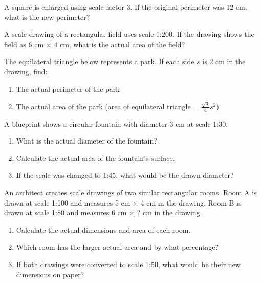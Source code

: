 \documentclass[12pt]{article}
\begin{document}
\begin{enumerate}[left=0pt, start=11]

\item A square is enlarged using scale factor 3. If the original perimeter was 12 cm, what is the new perimeter?

\item A scale drawing of a rectangular field uses scale 1:200. If the drawing shows the field as 6 cm × 4 cm, what is the actual area of the field?


The equilateral triangle below represents a park. If each side $s$ is 2 cm in the drawing, find:
\begin{enumerate}
    \item The actual perimeter of the park
    \item The actual area of the park (area of equilateral triangle = $\frac{\sqrt{3}}{4}s^2$)
\end{enumerate}

\begin{center}
\item {}
\end{center}

\newpage{}

\item A blueprint shows a circular fountain with diameter 3 cm at scale 1:30. 
\begin{enumerate}
    \item What is the actual diameter of the fountain?
    \item Calculate the actual area of the fountain's surface.
    \item If the scale was changed to 1:45, what would be the drawn diameter?
\end{enumerate}

\item An architect creates scale drawings of two similar rectangular rooms. Room A is drawn at scale 1:100 and measures 5 cm × 4 cm in the drawing. Room B is drawn at scale 1:80 and measures 6 cm × ? cm in the drawing.
\begin{enumerate}
    \item Calculate the actual dimensions and area of each room.
    \item Which room has the larger actual area and by what percentage?
    \item If both drawings were converted to scale 1:50, what would be their new dimensions on paper?
\end{enumerate}

\end{enumerate}
\end{document}
